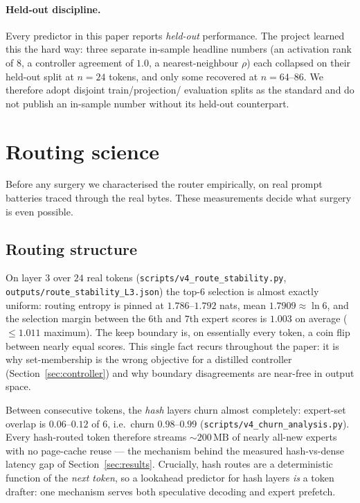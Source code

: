 \documentclass[11pt]{article}
\newcommand{\code}[1]{\texttt{#1}}
\begin{document}
\paragraph{Held-out discipline.}
Every predictor in this paper reports \emph{held-out} performance. The project
learned this the hard way: three separate in-sample headline numbers (an
activation rank of $8$, a controller agreement of $1.0$, a nearest-neighbour
$\rho$) each collapsed on their held-out split at $n=24$ tokens, and only some
recovered at $n=64$--$86$. We therefore adopt disjoint train/projection/
evaluation splits as the standard and do not publish an in-sample number without
its held-out counterpart.

\section{Routing science}
\label{sec:routing}

Before any surgery we characterised the router empirically, on real prompt
batteries traced through the real bytes. These measurements decide what surgery
is even possible.

\subsection{Routing structure}
\label{sec:structure}

On layer $3$ over $24$ real tokens (\code{scripts/v4\_route\_stability.py},
\code{outputs/route\_stability\_L3.json}) the top-$6$ selection is almost exactly
uniform: routing entropy is pinned at $1.786$--$1.792$ nats, mean $1.7909
\approx \ln 6$, and the selection margin between the $6$th and $7$th expert
scores is $1.003$ on average ($\le 1.011$ maximum). The keep boundary is, on
essentially every token, a coin flip between nearly equal scores. This single
fact recurs throughout the paper: it is why set-membership is the wrong objective
for a distilled controller (Section~\ref{sec:controller}) and why boundary
disagreements are near-free in output space.

Between consecutive tokens, the \emph{hash} layers churn almost completely:
expert-set overlap is $0.06$--$0.12$ of $6$, i.e.\ churn $0.98$--$0.99$
(\code{scripts/v4\_churn\_analysis.py}). Every hash-routed token therefore
streams ${\sim}200\,\textrm{MB}$ of nearly all-new experts with no page-cache
reuse --- the mechanism behind the measured hash-vs-dense latency gap of
Section~\ref{sec:results}. Crucially, hash routes are a deterministic function of
the \emph{next token}, so a lookahead predictor for hash layers \emph{is} a token
drafter: one mechanism serves both speculative decoding and expert prefetch.
\end{document}
